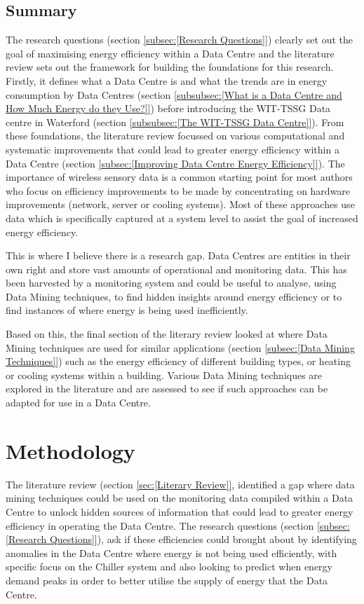 \documentclass[12pt]{scrartcl}
\begin{document}
\subsection{Summary}  
\label{subsec:[Summary]}
The research questions (section \ref{subsec:[Research Questions]}) clearly set out the goal of maximising energy efficiency within a Data Centre and the literature review sets out the framework for building the foundations for this research. Firstly, it defines what a Data Centre is and what the trends are in energy consumption by Data Centres (section \ref{subsubsec:[What is a Data Centre and How Much Energy do they Use?]}) before introducing the WIT-TSSG Data centre in Waterford (section \ref{subsubsec:[The WIT-TSSG Data Centre]}). From these foundations, the literature review focussed on various computational and systematic improvements that could lead to greater energy efficiency within a Data Centre (section \ref{subsec:[Improving Data Centre Energy Efficiency]}). The importance of wireless sensory data is a common starting point for most authors who focus on efficiency improvements to be made by concentrating on hardware improvements (network, server or cooling systems). Most of these approaches use data which is specifically captured at a system level to assist the goal of increased energy efficiency.

This is where I believe there is a research gap. Data Centres are entities in their own right and store vast amounts of operational and monitoring data. This has been harvested by a monitoring system and could be useful to analyse, using Data Mining techniques, to find hidden insights around energy efficiency or to find instances of where energy is being used inefficiently. 

Based on this, the final section of the literary review looked at where Data Mining techniques are used for similar applications (section \ref{subsec:[Data Mining Techniques]}) such as the energy efficiency of different building types, or heating or cooling systems within a building. Various Data Mining techniques are explored in the literature and are assessed to see if such approaches can be adapted for use in a Data Centre.   

\section{Methodology}

\label{sec:[Methodology]}

The literature review (section \ref{sec:[Literary Review]}, identified a gap where data mining techniques could be used on the monitoring data compiled within a Data Centre to unlock hidden sources of information that could lead to greater energy efficiency in operating the Data Centre. The research questions (section \ref{subsec:[Research Questions]}), ask if these efficiencies could brought about by identifying anomalies in the Data Centre where energy is not being used efficiently, with specific focus on the Chiller system and also looking to predict when energy demand peaks in order to better utilise the supply of energy that the Data Centre.
\end{document}
